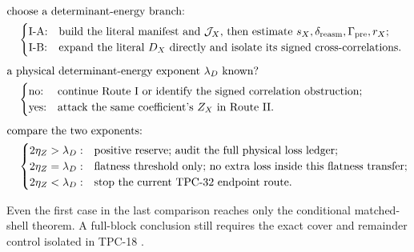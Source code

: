 \begin{equation}
\begin{aligned}
&\text{choose a determinant-energy branch:}\\
&\quad\begin{cases}
\text{I-A:} & \text{build the literal manifest and \(\mathcal J_X\), then
estimate \(s_X,\delta_{\rm reasm},\Gamma_{\rm pre},r_X\);}\\
\text{I-B:} & \text{expand the literal \(D_X\) directly and isolate
its signed cross-correlations.}
\end{cases}\\[0.4em]
&\text{a physical determinant-energy exponent \(\lambda_D\) known?}\\
&\quad\begin{cases}
\text{no:} & \text{continue Route I or identify the signed
correlation obstruction;}\\
\text{yes:}& \text{attack the same coefficient's \(Z_X\) in Route II.}
\end{cases}\\[0.4em]
&\text{compare the two exponents:}\\
&\quad\begin{cases}
2\eta_Z>\lambda_D:& \text{positive reserve; audit the full physical
loss ledger;}\\
2\eta_Z=\lambda_D:& \text{flatness threshold only; no extra
loss inside this flatness transfer;}\\
2\eta_Z<\lambda_D:& \text{stop the current TPC-32 endpoint route.}
\end{cases}
\end{aligned}
\label{eq:operational-tree}
\end{equation}

Even the first case in the last comparison reaches only the
conditional matched-shell theorem.  A full-block conclusion still
requires the exact cover and remainder control isolated in TPC-18
\citep{WangTPC18}.
